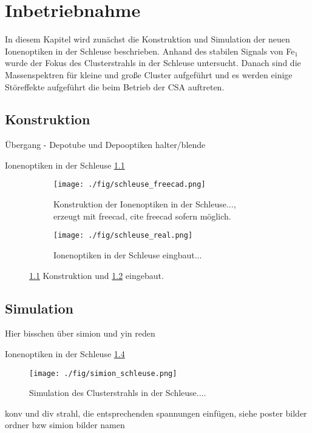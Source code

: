 \chapter{Inbetriebnahme}
In diesem Kapitel wird zunächst die Konstruktion und Simulation der neuen Ionenoptiken in der Schleuse beschrieben.
Anhand des stabilen Signals von Fe$_1$ wurde der Fokus des Clusterstrahls in der Schleuse untersucht.
Danach sind die Massenspektren für kleine und große Cluster aufgeführt und es werden einige Störeffekte aufgeführt die beim Betrieb der CSA auftreten.
\section{Konstruktion}
Übergang - Depotube und Depooptiken halter/blende

Ionenoptiken in der Schleuse \ref{fig:schleuse_freecad} 

\begin{figure}
    \begin{subfigure}[t]{0.475\textwidth}
      \texttt{[image: ./fig/schleuse\_freecad.png]}
      \caption{Konstruktion der Ionenoptiken in der Schleuse..., erzeugt mit freecad, cite freecad sofern möglich.}
      \label{fig:schleuse_freecad}
    \end{subfigure}\hfill
    \begin{subfigure}[t]{0.475\textwidth}
      \texttt{[image: ./fig/schleuse\_real.png]}
      \caption{Ionenoptiken in der Schleuse eingbaut...}
      \label{fig:schleuse_real}
    \end{subfigure}
    \caption{\ref{fig:schleuse_freecad} Konstruktion und \ref{fig:schleuse_real} eingebaut.} 
    \label{fig:schleuse_innen}
\end{figure}


\section{Simulation}
Hier bisschen über simion \cite{Manura.2008} und yin \cite{Yin.2007} reden

Ionenoptiken in der Schleuse \ref{fig:simion_schleuse} 

\begin{figure}
    \centering
    \texttt{[image: ./fig/simion\_schleuse.png]}
    \caption{Simulation des Clusterstrahls in der Schleuse....}
    \label{fig:simion_schleuse}
\end{figure}
konv und div strahl, die entsprechenden spannungen einfügen, siehe poster bilder ordner bzw simion bilder namen

